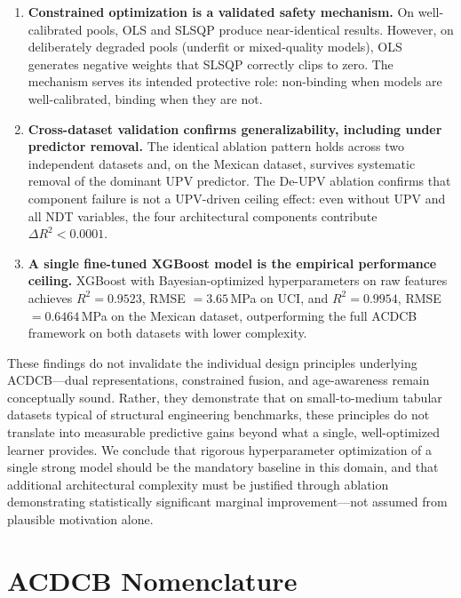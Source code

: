 \documentclass[journal]{IEEEtran}
\begin{document}
\begin{enumerate}
\item \textbf{Constrained optimization is a validated safety mechanism.} On well-calibrated pools, OLS and SLSQP produce near-identical results. However, on deliberately degraded pools (underfit or mixed-quality models), OLS generates negative weights that SLSQP correctly clips to zero. The mechanism serves its intended protective role: non-binding when models are well-calibrated, binding when they are not.

\item \textbf{Cross-dataset validation confirms generalizability, including under predictor removal.} The identical ablation pattern holds across two independent datasets and, on the Mexican dataset, survives systematic removal of the dominant UPV predictor. The De-UPV ablation confirms that component failure is not a UPV-driven ceiling effect: even without UPV and all NDT variables, the four architectural components contribute $\Delta R^2 < 0.0001$.

\item \textbf{A single fine-tuned XGBoost model is the empirical performance ceiling.} XGBoost with Bayesian-optimized hyperparameters on raw features achieves $R^2 = 0.9523$, RMSE $= 3.65$\,MPa on UCI, and $R^2 = 0.9954$, RMSE $= 0.6464$\,MPa on the Mexican dataset, outperforming the full ACDCB framework on both datasets with lower complexity.
\end{enumerate}

These findings do not invalidate the individual design principles underlying ACDCB---dual representations, constrained fusion, and age-awareness remain conceptually sound. Rather, they demonstrate that on small-to-medium tabular datasets typical of structural engineering benchmarks, these principles do not translate into measurable predictive gains beyond what a single, well-optimized learner provides. We conclude that rigorous hyperparameter optimization of a single strong model should be the mandatory baseline in this domain, and that additional architectural complexity must be justified through ablation demonstrating statistically significant marginal improvement---not assumed from plausible motivation alone.

\appendices
\section{ACDCB Nomenclature}
\end{document}
